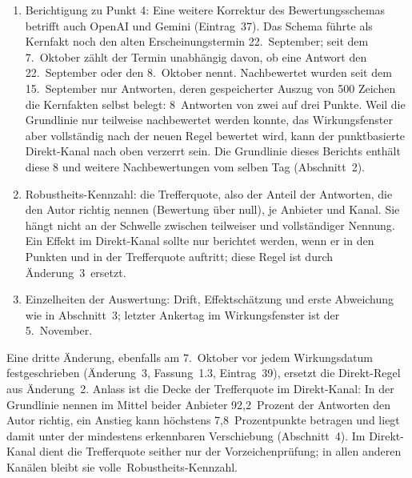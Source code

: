 \documentclass[11pt]{article}
\providecommand{\tightlist}{\setlength{\itemsep}{0pt}\setlength{\parskip}{0pt}}
\begin{document}
\begin{enumerate}
\def\labelenumi{\arabic{enumi}.}
\tightlist
\item
  Berichtigung zu Punkt 4: Eine weitere Korrektur des Bewertungsschemas betrifft auch OpenAI und Gemini (Eintrag~37). Das Schema führte als Kernfakt noch den alten Erscheinungstermin 22.~September; seit dem 7.~Oktober zählt der Termin unabhängig davon, ob eine Antwort den 22.~September oder den 8.~Oktober nennt. Nachbewertet wurden seit dem 15.~September nur Antworten, deren gespeicherter Auszug von 500 Zeichen die Kernfakten selbst belegt: 8~Antworten von zwei auf drei Punkte. Weil die Grundlinie nur teilweise nachbewertet werden konnte, das Wirkungsfenster aber vollständig nach der neuen Regel bewertet wird, kann der punktbasierte Direkt-Kanal nach oben verzerrt sein. Die Grundlinie dieses Berichts enthält diese 8 und weitere Nachbewertungen vom selben Tag (Abschnitt~2).
\item
  Robustheits-Kennzahl: die Trefferquote, also der Anteil der Antworten, die den Autor richtig nennen (Bewertung über null), je Anbieter und Kanal. Sie hängt nicht an der Schwelle zwischen teilweiser und vollständiger Nennung. Ein Effekt im Direkt-Kanal sollte nur berichtet werden, wenn er in den Punkten und in der Trefferquote auftritt; diese Regel ist durch Änderung~3~\mbox{ersetzt.}
\item
  Einzelheiten der Auswertung: Drift, Effektschätzung und erste Abweichung wie in Abschnitt~3; letzter Ankertag im Wirkungsfenster ist der 5.~November.
\end{enumerate}

Eine dritte Änderung, ebenfalls am 7.~Oktober vor jedem Wirkungsdatum festgeschrieben (Änderung~3, Fassung~1.3, Eintrag~39), ersetzt die Direkt-Regel aus Änderung~2. Anlass ist die Decke der Trefferquote im Direkt-Kanal: In der Grundlinie nennen im Mittel beider Anbieter 92,2~Prozent der Antworten den Autor richtig, ein Anstieg kann höchstens 7,8~Prozentpunkte betragen und liegt damit unter der mindestens erkennbaren Verschiebung (Abschnitt~4). Im Direkt-Kanal dient die Trefferquote seither nur der Vorzeichenprüfung; in allen anderen Kanälen bleibt sie volle~\mbox{Robustheits-Kennzahl.}
\end{document}
